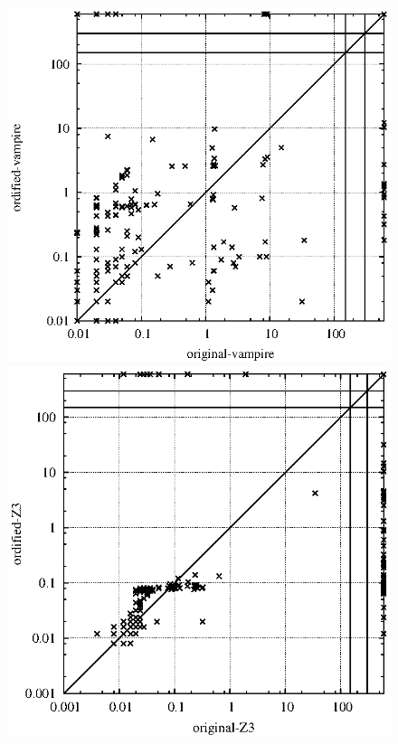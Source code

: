 \documentclass{article}
\begin{document}
\begin{figure}[t]
\begin{center}
\includegraphics[scale=0.55,trim=20mm 0mm 30mm 0mm]{Plots/Ordified/Vampire/test_original_vampire_ordified_vampire_300.eps}
\includegraphics[scale=0.55,trim=7mm 0mm 30mm 0mm]{Plots/Ordified/Z3/test_original_Z3_ordified_Z3_300.eps}

\end{center}
\end{figure}
\end{document}
